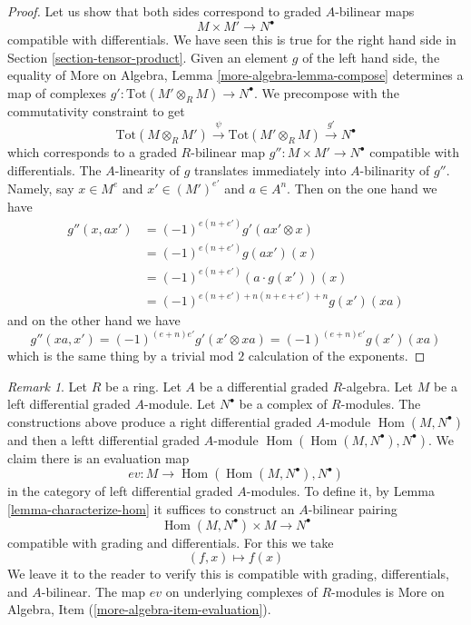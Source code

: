 \documentclass{stacks-project}
\theoremstyle{plain}
\theoremstyle{definition}
\theoremstyle{remark}
\newtheorem{remark}[subsection]{Remark}
\numberwithin{equation}{subsection}
\def\Hom{\mathop{\mathrm{Hom}}\nolimits}
\begin{document}
\begin{proof}
Let us show that both sides correspond to graded $A$-bilinear maps
$$
M \times M' \longrightarrow N^\bullet
$$
compatible with differentials. We have seen this is true for the right
hand side in Section \ref{section-tensor-product}. Given an element
$g$ of the left hand side, the equality of
More on Algebra, Lemma \ref{more-algebra-lemma-compose}
determines a map of complexes
$g' : \text{Tot}(M' \otimes_R M) \to N^\bullet$.
We precompose with the commutativity constraint to get
$$
\text{Tot}(M \otimes_R M') \xrightarrow{\psi}
\text{Tot}(M' \otimes_R M) \xrightarrow{g'}
N^\bullet
$$
which corresponds to a graded $R$-bilinear
map $g'' : M \times M' \to N^\bullet$ compatible with differentials.
The $A$-linearity of $g$ translates immediately into $A$-bilinarity of $g''$.
Namely, say $x \in M^e$ and $x' \in (M')^{e'}$ and $a \in A^n$. Then
on the one hand we have
\begin{align*}
g''(x, ax')
& =
(-1)^{e(n + e')} g'(ax' \otimes x) \\
& =
(-1)^{e(n + e')} g(ax')(x) \\
& =
(-1)^{e(n + e')} (a \cdot g(x'))(x) \\
& =
(-1)^{e(n + e') + n(n + e + e') + n} g(x')(xa)
\end{align*}
and on the other hand we have
$$
g''(xa, x') = (-1)^{(e + n)e'} g'(x' \otimes xa) =
(-1)^{(e + n)e'} g(x')(xa) 
$$
which is the same thing by a trivial mod $2$ calculation of the exponents.
\end{proof}

\begin{remark}
\label{remark-evaluation-map-left}
Let $R$ be a ring. Let $A$ be a differential graded $R$-algebra.
Let $M$ be a left differential graded $A$-module. Let
$N^\bullet$ be a complex of $R$-modules. The constructions above
produce a right differential graded $A$-module $\Hom(M, N^\bullet)$
and then a leftt differential graded $A$-module
$\Hom(\Hom(M, N^\bullet), N^\bullet)$. We claim there is an
evaluation map
$$
ev : M \longrightarrow \Hom(\Hom(M, N^\bullet), N^\bullet)
$$
in the category of left differential graded $A$-modules. To define it, by
Lemma \ref{lemma-characterize-hom} it suffices to construct an
$A$-bilinear pairing
$$
\Hom(M, N^\bullet) \times M \longrightarrow N^\bullet
$$
compatible with grading and differentials. For this we take
$$
(f, x) \longmapsto f(x)
$$
We leave it to the reader to verify this is compatible with grading,
differentials, and $A$-bilinear. The map $ev$ on underlying complexes
of $R$-modules is More on Algebra, Item (\ref{more-algebra-item-evaluation}).
\end{remark}
\end{document}
